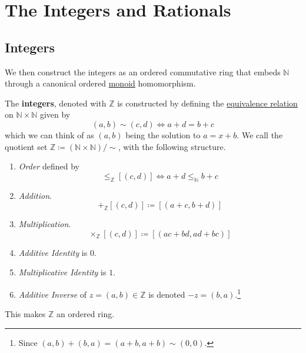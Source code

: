 \section{The Integers and Rationals}

\subsection{Integers} 

  We then construct the integers as an ordered commutative ring that embeds $\mathbb{N}$ through a canonical ordered \hyperref[def:monoid]{monoid} homomorphism.  

  \begin{definition}[Integers]
    \label{def:integers}
    The \textbf{integers}, denoted with $\mathbb{Z}$ is constructed by defining the \hyperref[def:equivalence_relation]{equivalence relation} on $\mathbb{N} \times \mathbb{N}$ given by 
    \begin{equation}
      (a, b) \sim (c, d) \iff a + d = b + c
    \end{equation}
    which we can think of as $(a, b)$ being the solution to $a = x + b$. We call the quotient set $\mathbb{Z} \coloneqq (\mathbb{N} \times \mathbb{N})/{\sim}$, with the following structure. 
    \begin{enumerate}
      \item \textit{Order} defined by 
        \begin{equation} 
          [(a, b)] \leq_\mathbb{Z} [(c, d)] \iff a + d \leq_\mathbb{N} b + c 
        \end{equation}
      \item \textit{Addition}. 
        \begin{equation}
          [(a, b)] +_{\mathbb{Z}} [(c, d)] \coloneqq [(a + c, b + d)] 
        \end{equation}
      \item \textit{Multiplication}. 
        \begin{equation}
          [(a, b)] \times_{\mathbb{Z}} [(c, d)] \coloneqq [(ac + bd, ad + bc)] 
        \end{equation}

      \item \textit{Additive Identity} is $0$. 
      \item \textit{Multiplicative Identity} is $1$. 
      \item \textit{Additive Inverse} of $z = (a, b) \in \mathbb{Z}$ is denoted $-z = (b, a)$.\footnote{Since $(a, b) + (b, a) = (a + b, a + b) \sim (0, 0)$.}
    \end{enumerate}
    This makes $\mathbb{Z}$ an ordered ring. 
  \end{definition} 
  
